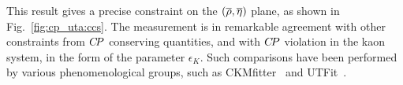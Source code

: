 This result gives a precise constraint on the $(\overline{\rho},\overline{\eta})$ plane,
as shown in Fig.~\ref{fig:cp_uta:ccs}.
The measurement is in remarkable agreement with other constraints from 
$C\!P$ conserving quantities, 
and with $C\!P$ violation in the kaon system, in the form of the parameter $\epsilon_K$.
Such comparisons have been performed by various phenomenological groups,
such as CKMfitter~\cite{Charles:2004jd} 
and UTFit~\cite{Bona:2005vz}.

\begin{figure}[htbp]
  \begin{center}
    \hfill
\end{center}
\end{figure}

